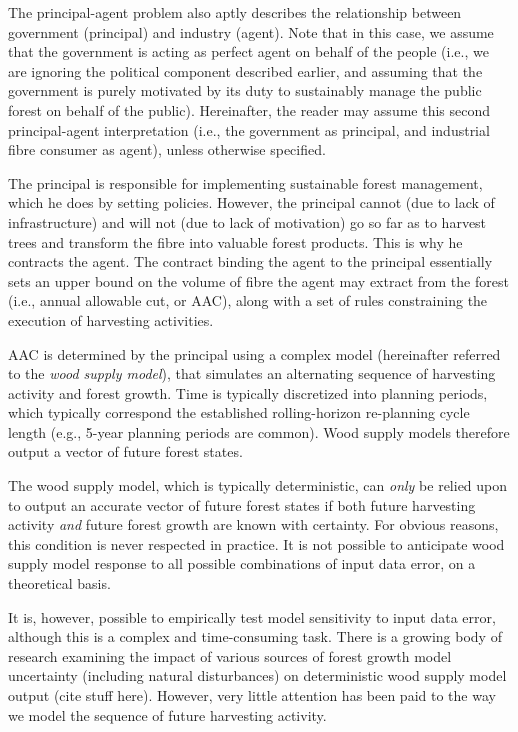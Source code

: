 The principal-agent problem also aptly describes the relationship between government (principal) and industry (agent). Note that in this case, we assume that the government is acting as perfect agent on behalf of the people (i.e., we are ignoring the political component described earlier, and assuming that the government is purely motivated by its duty to sustainably manage the public forest on behalf of the public). Hereinafter, the reader may assume this second principal-agent interpretation (i.e., the government as principal, and industrial fibre consumer as agent), unless otherwise specified.

The principal is responsible for implementing sustainable forest management, which he does by setting policies. However, the principal cannot (due to lack of infrastructure) and will not (due to lack of motivation) go so far as to harvest trees and transform the fibre into valuable forest products. This is why he contracts the agent. The contract binding the agent to the principal essentially sets an upper bound on the volume of fibre the agent may extract from the forest (i.e., annual allowable cut, or AAC), along with a set of rules constraining the execution of harvesting activities. 

AAC is determined by the principal using a complex model (hereinafter referred to the \emph{wood supply model}), that simulates an alternating sequence of harvesting activity and forest growth. Time is typically discretized into planning periods, which typically correspond the established rolling-horizon re-planning cycle length (e.g., 5-year planning periods are common). Wood supply models therefore output a vector of future forest states. 

The wood supply model, which is typically deterministic, can \emph{only} be relied upon to output an accurate vector of future forest states if both future harvesting activity \emph{and} future forest growth are known with certainty. For obvious reasons, this condition is never respected in practice. It is not possible to anticipate wood supply model response to all possible combinations of input data error, on a theoretical basis. 

It is, however, possible to empirically test model sensitivity to input data error, although this is a complex and time-consuming task. There is a growing body of research examining the impact of various sources of forest growth model uncertainty (including natural disturbances) on deterministic wood supply model output (cite stuff here). However, very little attention has been paid to the way we model the sequence of future harvesting activity. 


